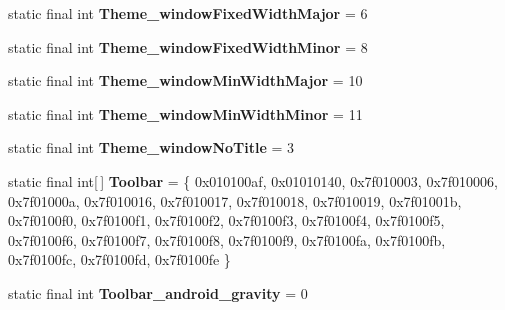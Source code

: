 \begin{DoxyCompactItemize}
\item 
\hypertarget{classandroid_1_1support_1_1v7_1_1appcompat_1_1_r_1_1styleable_a1af5238f53c6000123ae3d20cd3280e2}{}static final int {\bfseries Theme\+\_\+window\+Fixed\+Width\+Major} = 6\label{classandroid_1_1support_1_1v7_1_1appcompat_1_1_r_1_1styleable_a1af5238f53c6000123ae3d20cd3280e2}

\item 
\hypertarget{classandroid_1_1support_1_1v7_1_1appcompat_1_1_r_1_1styleable_a0be755f7dbefbe333c30e5b2cae53de6}{}static final int {\bfseries Theme\+\_\+window\+Fixed\+Width\+Minor} = 8\label{classandroid_1_1support_1_1v7_1_1appcompat_1_1_r_1_1styleable_a0be755f7dbefbe333c30e5b2cae53de6}

\item 
\hypertarget{classandroid_1_1support_1_1v7_1_1appcompat_1_1_r_1_1styleable_a70514e5a7100ec31d072e320ca82ebf2}{}static final int {\bfseries Theme\+\_\+window\+Min\+Width\+Major} = 10\label{classandroid_1_1support_1_1v7_1_1appcompat_1_1_r_1_1styleable_a70514e5a7100ec31d072e320ca82ebf2}

\item 
\hypertarget{classandroid_1_1support_1_1v7_1_1appcompat_1_1_r_1_1styleable_a65e67ff67b42907bf8ee8faa315f7b27}{}static final int {\bfseries Theme\+\_\+window\+Min\+Width\+Minor} = 11\label{classandroid_1_1support_1_1v7_1_1appcompat_1_1_r_1_1styleable_a65e67ff67b42907bf8ee8faa315f7b27}

\item 
\hypertarget{classandroid_1_1support_1_1v7_1_1appcompat_1_1_r_1_1styleable_a8ee13b009af3e57f10aaf2f1400ab6fc}{}static final int {\bfseries Theme\+\_\+window\+No\+Title} = 3\label{classandroid_1_1support_1_1v7_1_1appcompat_1_1_r_1_1styleable_a8ee13b009af3e57f10aaf2f1400ab6fc}

\item 
\hypertarget{classandroid_1_1support_1_1v7_1_1appcompat_1_1_r_1_1styleable_a2daba9587ef9f700f2d54cf13435cb32}{}static final int\mbox{[}$\,$\mbox{]} {\bfseries Toolbar} = \{ 0x010100af, 0x01010140, 0x7f010003, 0x7f010006, 0x7f01000a, 0x7f010016, 0x7f010017, 0x7f010018, 0x7f010019, 0x7f01001b, 0x7f0100f0, 0x7f0100f1, 0x7f0100f2, 0x7f0100f3, 0x7f0100f4, 0x7f0100f5, 0x7f0100f6, 0x7f0100f7, 0x7f0100f8, 0x7f0100f9, 0x7f0100fa, 0x7f0100fb, 0x7f0100fc, 0x7f0100fd, 0x7f0100fe \}\label{classandroid_1_1support_1_1v7_1_1appcompat_1_1_r_1_1styleable_a2daba9587ef9f700f2d54cf13435cb32}

\item 
\hypertarget{classandroid_1_1support_1_1v7_1_1appcompat_1_1_r_1_1styleable_a84a79bd8c687a1eef63dda96bb410f01}{}static final int {\bfseries Toolbar\+\_\+android\+\_\+gravity} = 0\label{classandroid_1_1support_1_1v7_1_1appcompat_1_1_r_1_1styleable_a84a79bd8c687a1eef63dda96bb410f01}


\end{DoxyCompactItemize}
